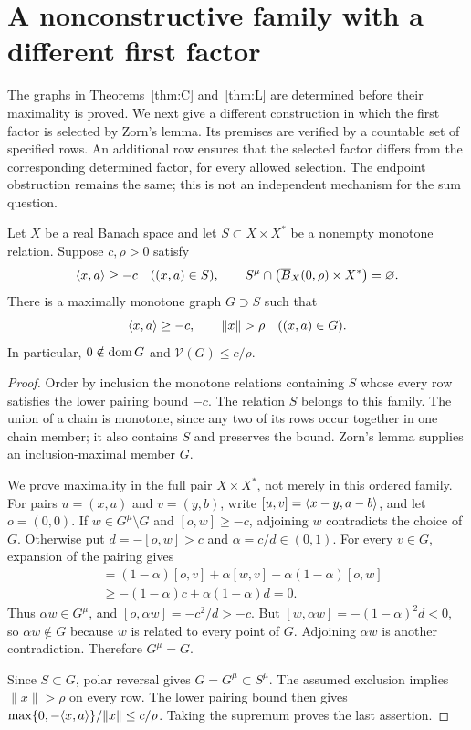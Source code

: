 \section{A nonconstructive family with a different first factor}
\label{sec:nonconstructive}
The graphs in Theorems~\ref{thm:C} and~\ref{thm:L} are determined before
their maximality is proved. We next give a different construction in which
the first factor is selected by Zorn's lemma. Its premises are verified
by a countable set of specified rows. An additional row ensures that the
selected factor differs from the corresponding determined factor, for
every allowed selection. The endpoint obstruction remains the same;
this is not an independent mechanism for the sum question.

\begin{lemma}
\label{lem:capped-extension}
Let $X$ be a real Banach space and let $S\subset X\times X^*$ be a
nonempty monotone relation. Suppose $c,\rho>0$ satisfy
\[
\langle x,a\rangle\ge-c\quad((x,a)\in S),\qquad
S^\mu\cap\bigl(\overline B_X(0,\rho)\times X^*\bigr)=\varnothing.
\]
There is a maximally monotone graph $G\supset S$ such that
\[
\pair{x}{a}\ge-c,\qquad \|x\|>\rho\quad((x,a)\in G).
\]
In particular, $0\notin\operatorname{dom} G$ and $\mathcal V(G)\le c/\rho$.
\end{lemma}
\begin{proof}
Order by inclusion the monotone relations containing $S$ whose every row
satisfies the lower pairing bound $-c$. The relation $S$ belongs to this
family. The union of a chain is monotone, since any two of its rows occur
together in one chain member; it also contains $S$ and preserves the
bound. Zorn's lemma supplies an inclusion-maximal member $G$.

We prove maximality in the full pair $X\times X^*$, not merely in this
ordered family. For pairs $u=(x,a)$ and $v=(y,b)$, write
$[u,v]=\langle x-y,a-b\rangle$, and let $o=(0,0)$. If
$w\in G^\mu\setminus G$ and $[o,w]\ge-c$, adjoining $w$ contradicts
the choice of $G$. Otherwise put $d=-[o,w]>c$ and $\alpha=c/d\in(0,1)$.
For every $v\in G$, expansion of the pairing gives
\begin{align*}
[\alpha w,v]
&=(1-\alpha)[o,v]+\alpha[w,v]-\alpha(1-\alpha)[o,w]\\
&\ge-(1-\alpha)c+\alpha(1-\alpha)d=0.
\end{align*}
Thus $\alpha w\in G^\mu$, and
$[o,\alpha w]=-c^2/d>-c$. But
$[w,\alpha w]=-(1-\alpha)^2d<0$, so $\alpha w\notin G$ because
$w$ is related to every point of $G$. Adjoining $\alpha w$ is another
contradiction. Therefore $G^\mu=G$.

Since $S\subset G$, polar reversal gives $G=G^\mu\subset S^\mu$.
The assumed exclusion implies $\|x\|>\rho$ on every row. The lower
pairing bound then gives
$\max\{0,-\langle x,a\rangle\}/\|x\|\le c/\rho$. Taking the supremum
proves the last assertion.
\end{proof}

